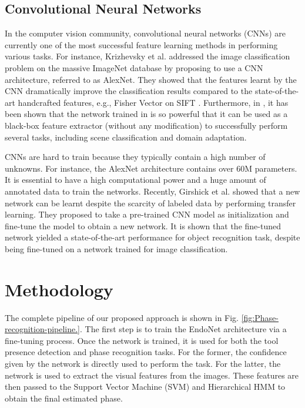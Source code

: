 \documentclass[journal]{IEEEtran} \usepackage{amssymb}
\begin{document}
\subsection{Convolutional Neural Networks}

In the computer vision community, convolutional neural networks (CNNs)
are currently one of the most successful feature learning methods in
performing various tasks. For instance, 
Krizhevsky et al. \cite{krizhevsky_nips2012} addressed the image classification problem on the massive
ImageNet database \cite{imagenet} by proposing to use a CNN architecture, referred to as AlexNet. 
They showed that the features
learnt by the CNN dramatically improve the classification results
compared to the state-of-the-art handcrafted features, e.g., Fisher
Vector on SIFT \cite{sanchez_cvpr2011}. Furthermore, in \cite{donahue_corr2013}, it has been shown 
that the network trained in \cite{krizhevsky_nips2012} is so powerful that 
it can be used as a black-box feature extractor 
(without any modification) to successfully perform several tasks, 
including scene classification and domain adaptation.  

CNNs are hard to train because they typically contain a high number of unknowns. For instance, the AlexNet architecture contains over 60M parameters. It is essential to have a high computational power and a huge amount of annotated data to train the networks. Recently, Girshick et al. \cite{girshick_cvpr2014} showed that a new network can be learnt despite the scarcity of labeled data by performing transfer learning. 
They proposed to take a pre-trained CNN model as initialization and fine-tune 
the model to obtain a new network. It is shown that the fine-tuned network yielded a state-of-the-art performance for object recognition task, despite being fine-tuned on a network trained
for image classification.


\section{Methodology}

The complete pipeline of our proposed approach is shown in Fig. \ref{fig:Phase-recognition-pipeline.}.
The first step is to train the EndoNet architecture via a fine-tuning process.
Once the network is trained, it is used for both the tool presence detection and phase recognition tasks. For the former, the confidence given by the network is directly used to perform the task. For the latter, the network is used to extract the visual features from
the images. These features are then passed to the Support Vector
Machine (SVM) and Hierarchical HMM to obtain
the final estimated phase. 
\end{document}
